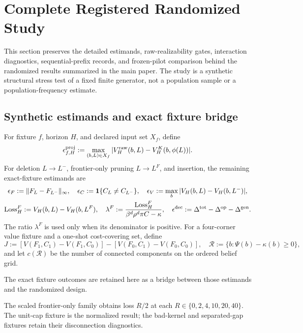 \section{Complete Registered Randomized Study}
\label{sec:supp-randomized-study}

This section preserves the detailed estimands, raw-realizability gates,
interaction diagnostics, sequential-prefix records, and frozen-pilot
comparison behind the randomized results summarized in the main paper.  The
study is a synthetic structural stress test of a fixed finite generator, not a
population sample or a population-frequency estimate.

\subsection{Synthetic estimands and exact fixture bridge}
\label{sec:supp-synthetic-estimands}

For fixture \(f\), horizon \(H\), and declared input set \(X_f\), define
\[
 \epsilon^{\rm proj}_{f,H}
 :=\max_{(b,L)\in X_f}
   |V_H^{\rm raw}(b,L)-V_H^K(b,\phi(L))|.
\]
For deletion \(L\to L^-\), frontier-only pruning \(L\to L^F\), and insertion,
the remaining exact-fixture estimands are
\[
\begin{gathered}
 \epsilon_F:=\lVert F_L-F_{L^-}\rVert_\infty,\quad
 \epsilon_C:=\mathbf 1\{C_L\ne C_{L^-}\},\quad
 \epsilon_V:=\max_b|V_H(b,L)-V_H(b,L^-)|,\\
 \operatorname{Loss}_H^F:=V_H(b,L)-V_H(b,L^F),\quad
 \lambda^F:=
 \frac{\operatorname{Loss}_H^F}{\beta^d\rho^d\pi C-\kappa},\quad
 \epsilon^{\rm dec}:=
 \Delta^{\rm tot}-\Delta^{\rm op}-\Delta^{\rm gen}.
\end{gathered}
\]
The ratio \(\lambda^F\) is used only when its denominator is positive.  For a
four-corner value fixture and a one-shot cost-covering set, define
\[
 J:=[V(F_1,C_1)-V(F_1,C_0)]-[V(F_0,C_1)-V(F_0,C_0)],
 \quad
 \mathcal R:=\{b:\Psi(b)-\kappa(b)\ge0\},
\]
and let \(c(\mathcal R)\) be the number of connected components on the ordered
belief grid.

The exact fixture outcomes are retained here as a bridge between those
estimands and the randomized design.
\begin{table}[htbp]
  \centering
  \small
  
  \caption{Selected-instance outcomes from the exact mechanism fixtures.}
  \label{tab:supp-numerical-mechanisms}
\end{table}

The scaled frontier-only family obtains loss \(R/2\) at each
\(R\in\{0,2,4,10,20,40\}\).  The unit-cap fixture is the normalized result;
the bad-kernel and separated-gap fixtures retain their disconnection
diagnostics.

